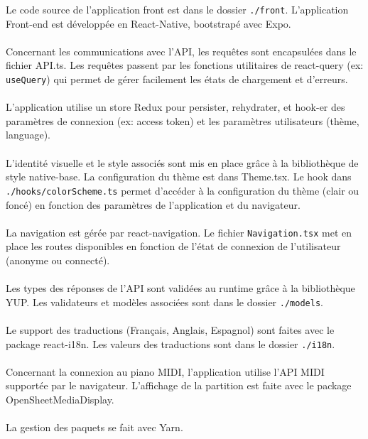 Le code source de l’application front est dans le  dossier \verb|./front|.
L’application Front-end est développée en React-Native, bootstrapé avec Expo.
\\\\
Concernant les communications avec l’API, les requêtes sont encapsulées dans le fichier API.ts. Les requêtes passent par les fonctions utilitaires de react-query (ex: \verb|useQuery|) qui permet de gérer facilement les états de chargement et d’erreurs.
\\\\
L’application utilise un store Redux pour persister, rehydrater, et hook-er des paramètres de connexion (ex: access token) et les paramètres utilisateurs (thème, language).
\\\\
L’identité visuelle et le style associés sont mis en place grâce à la bibliothèque de style native-base. La configuration du thème est dans Theme.tsx. Le hook dans \verb|./hooks/colorScheme.ts| permet d’accéder à la configuration du thème (clair ou foncé) en fonction des paramètres de l’application et du navigateur.
\\\\
La navigation est gérée par react-navigation. Le fichier \verb|Navigation.tsx| met en place les routes disponibles en fonction de l’état de connexion de l’utilisateur (anonyme ou connecté).
\\\\
Les types des réponses de l’API sont validées au runtime grâce à la bibliothèque YUP. Les validateurs et modèles associées sont dans le dossier \verb|./models|.
\\\\
Le support des traductions (Français, Anglais, Espagnol) sont faites avec le package react-i18n. Les valeurs des traductions sont dans le dossier \verb|./i18n|.
\\\\
Concernant la connexion au piano MIDI, l’application utilise l’API MIDI supportée par le navigateur.
L’affichage de la partition est faite avec le package OpenSheetMediaDisplay.
\\\\
La gestion des paquets se fait avec Yarn.
